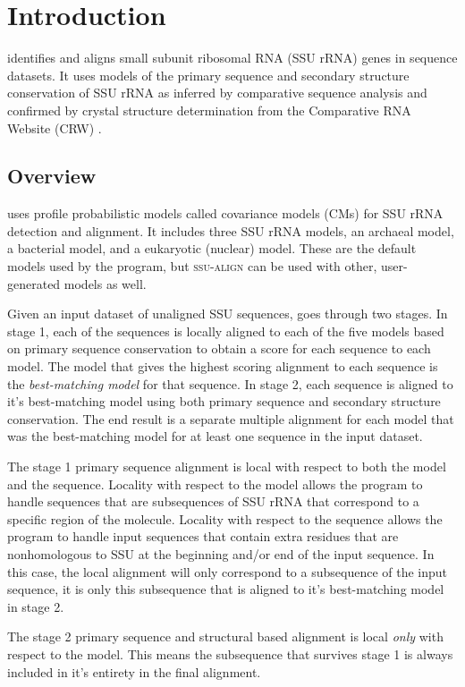 \section{Introduction}

 identifies and aligns small subunit ribosomal RNA
(SSU rRNA) genes in sequence datasets. It uses models of the primary
sequence and secondary structure conservation of SSU rRNA as inferred
by comparative sequence analysis and confirmed by crystal structure
determination from the Comparative RNA Website (CRW) \cite{Cannone02}.

\subsection{Overview}
 uses profile probabilistic models called
covariance models (CMs) for SSU rRNA detection and alignment. It
includes three SSU rRNA models, an archaeal model, a bacterial model,
and a eukaryotic (nuclear) model.  These are the default models used
by the program, but \textsc{ssu-align} can be used with other,
user-generated models as well.

Given an input dataset of unaligned SSU sequences,
 goes through two stages. In stage 1, each of the
sequences is locally aligned to each of the five models based on
primary sequence conservation to obtain a score for each sequence to
each model.  The model that gives the highest scoring alignment to
each sequence is the \emph{best-matching model} for that sequence.  In
stage 2, each sequence is aligned to it's best-matching model using
both primary sequence and secondary structure conservation. The end
result is a separate multiple alignment for each model that was the
best-matching model for at least one sequence in the input dataset.

The stage 1 primary sequence alignment is local with respect to both
the model and the sequence. Locality with respect to the model allows
the program to handle sequences that are subsequences of SSU
rRNA that correspond to a specific region of the molecule. Locality
with respect to the sequence allows the program to handle input
sequences that contain extra residues that are nonhomologous to SSU at
the beginning and/or end of the input sequence. In this case, the
local alignment will only correspond to a subsequence of the input
sequence, it is only this subsequence that is aligned to it's
best-matching model in stage 2.

The stage 2 primary sequence and structural based alignment is local
\emph{only} with respect to the model.  This means the subsequence
that survives stage 1 is always included in it's entirety in the final
alignment.

